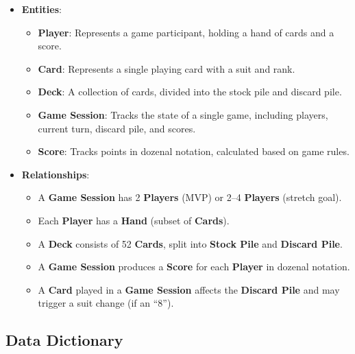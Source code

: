 \documentclass[12pt]{article}
\begin{document}
\begin{itemize}
    \item \textbf{Entities}:
    \begin{itemize}
        \item \textbf{Player}: Represents a game participant, holding a hand of cards and a score.
        \item \textbf{Card}: Represents a single playing card with a suit and rank.
        \item \textbf{Deck}: A collection of cards, divided into the stock pile and discard pile.
        \item \textbf{Game Session}: Tracks the state of a single game, including players, current turn, discard pile, and scores.
        \item \textbf{Score}: Tracks points in dozenal notation, calculated based on game rules.
    \end{itemize}
    \item \textbf{Relationships}:
    \begin{itemize}
        \item A \textbf{Game Session} has 2 \textbf{Players} (MVP) or 2--4 \textbf{Players} (stretch goal).
        \item Each \textbf{Player} has a \textbf{Hand} (subset of \textbf{Cards}).
        \item A \textbf{Deck} consists of 52 \textbf{Cards}, split into \textbf{Stock Pile} and \textbf{Discard Pile}.
        \item A \textbf{Game Session} produces a \textbf{Score} for each \textbf{Player} in dozenal notation.
        \item A \textbf{Card} played in a \textbf{Game Session} affects the \textbf{Discard Pile} and may trigger a suit change (if an ``8'').
    \end{itemize}
\end{itemize}

\subsection{Data Dictionary}
\end{document}

